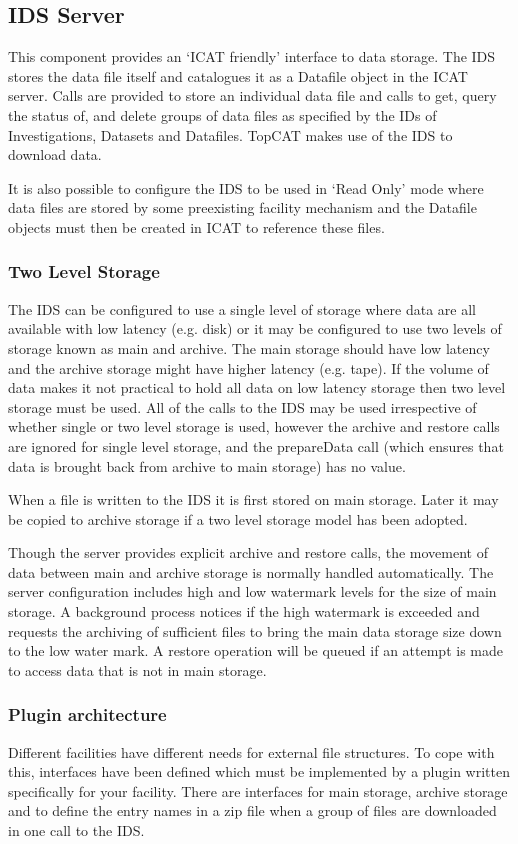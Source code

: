 \documentclass[a4paper]{jpconf}
\begin{document}
\subsection{IDS Server}
This component provides an `ICAT friendly' interface to data
storage. The IDS stores the data file itself and catalogues it as a
Datafile object in the ICAT server. Calls are provided to store an
individual data file and calls to get, query the status of, and delete
groups of data files as specified by the IDs of Investigations,
Datasets and Datafiles. TopCAT makes use of the IDS to download data.

It is also possible to configure the IDS to be used in `Read Only'
mode where data files are stored by some preexisting facility
mechanism and the Datafile objects must then be created in ICAT to
reference these files. 

\subsubsection{Two Level Storage}
The IDS can be configured to use a single level of storage where data
are all available with low latency (e.g. disk) or it may be configured
to use two levels of storage known as main and archive. The main
storage should have low latency and the archive storage might have
higher latency (e.g. tape). If the volume of data makes it not
practical to hold all data on low latency storage then two level
storage must be used. All of the calls to the IDS may be used
irrespective of whether single or two level storage is used, however
the archive and restore calls are ignored for single level storage,
and the prepareData call (which ensures that data is brought back from
archive to main storage) has no value.

When a file is written to the IDS it is first stored on main
storage. Later it may be copied to archive storage if a two level
storage model has been adopted.

Though the server provides explicit archive and restore calls, the
movement of data between main and archive storage is normally handled
automatically. The server configuration includes high and low
watermark levels for the size of main storage. A background process
notices if the high watermark is exceeded and requests the archiving
of sufficient files to bring the main data storage size down to the
low water mark. A restore operation will be queued if an attempt is
made to access data that is not in main storage.

\subsubsection{Plugin architecture}
Different facilities have different needs for external file
structures. To cope with this, interfaces have been defined which must
be implemented by a plugin written specifically for your
facility. There are interfaces for main storage, archive storage and
to define the entry names in a zip file when a group of files are
downloaded in one call to the IDS.
\end{document}
